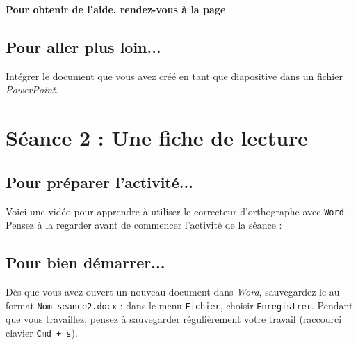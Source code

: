 \textbf{Pour obtenir de l'aide, rendez-vous à la page \pageref{aide_seancesWord3}}

\subsection{Pour aller plus loin...}

Intégrer le document que vous avez créé en tant que diapositive dans un fichier \emph{PowerPoint}.

\vfill




%
%
%
%

\pagebreak

\section{Séance 2 : Une fiche de lecture}\label{ficheTexte4e3}

\subsection{Pour préparer l'activité...}

\vspace{10pt}

Voici une vidéo pour apprendre à utiliser le correcteur d'orthographe avec \texttt{Word}. Pensez à la regarder avant de commencer l'activité de la séance :

\begin{center}
\end{center}

\vspace{12pt}

\subsection{Pour bien démarrer...}

\vspace{10pt}

Dès que vous avez ouvert un nouveau document dans \emph{Word}, sauvegardez-le au format \texttt{Nom-seance2.docx} : dans le menu \texttt{Fichier}, choisir \texttt{Enregistrer}. Pendant que vous travaillez, pensez à sauvegarder régulièrement votre travail (raccourci clavier \texttt{Cmd + s}).   


